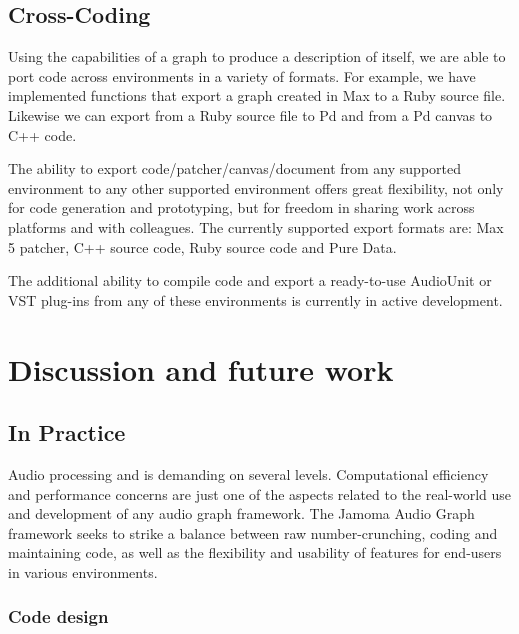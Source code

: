 \documentclass[twoside,a4paper]{article}
\begin{document}


\subsection{Cross-Coding} %

Using the capabilities of a graph to produce a description of itself, we are able to port code across environments in a variety of formats.  
For example, we have implemented functions that export a graph created in Max to a Ruby source file.  
Likewise we can export from a Ruby source file to Pd and from a Pd canvas to C++ code.  

The ability to export code/patcher/canvas/document from any supported environment to any other supported environment offers great flexibility, not only for code generation and prototyping, but for freedom in sharing work across platforms and with colleagues.  
The currently supported export formats are: Max 5 patcher, C++ source code, Ruby source code and Pure Data.

The additional ability to compile code and export a ready-to-use AudioUnit or VST plug-ins from any of these environments is currently in active development.





%
\section{Discussion and future work} %
%

\subsection{In Practice} %

Audio processing and is demanding on several levels.  Computational efficiency and performance concerns are just one of the aspects related to the real-world use and development of any audio graph framework.  The Jamoma Audio Graph framework seeks to strike a balance between raw number-crunching, coding and maintaining code, as well as the flexibility and usability of features for end-users in various environments.


\subsubsection{Code design} %
\end{document}
